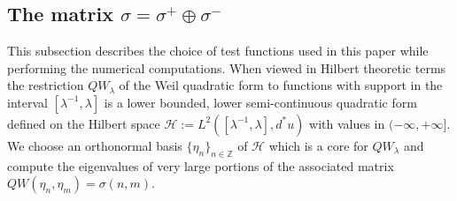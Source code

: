 \documentclass[cupthm]{CUP-JNL-JMJ}
\def\Z{{\mathbb Z}}
\def\cH{{\mathcal H}}
\numberwithin{equation}{section}
\theoremstyle{cupplain}
\theoremstyle{cupdefinition}
\theoremstyle{cupremark}
\theoremstyle{cupproof}
\begin{document}
\subsection{The matrix $\sigma=\sigma^+\oplus \sigma^-$}\label{sectexpexpl}
This  subsection describes the choice of test functions used  in this paper while performing the numerical computations. When viewed in Hilbert theoretic terms the restriction $QW_\lambda$ of the Weil quadratic form to functions with support in the interval $[\lambda^{-1},\lambda]$ is a lower bounded, lower semi-continuous quadratic form defined on the Hilbert space $\cH:=L^2([\lambda^{-1},\lambda],d^*u)$ with values in $(-\infty,+\infty]$. We choose an orthonormal basis $\{\eta_n\}_{n\in \Z}$ of $\cH$ which is a core for $QW_\lambda$ and compute the eigenvalues of very large portions of the associated matrix $QW(\eta_n,\eta_m)=\sigma(n,m)$. 
\end{document}
